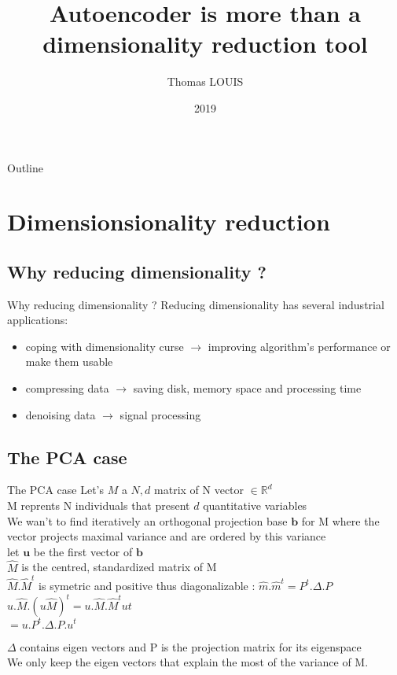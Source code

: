 \documentclass{beamer}
\title{Autoencoder is more than a dimensionality reduction tool}
\author{Thomas LOUIS}
\date{2019}
\newcommand{\reels}{\mathbb{R}}
\begin{document}
\begin{frame}
  \titlepage
\end{frame}

\begin{frame}[shrink=20]{Outline}
  \tableofcontents
\end{frame}

\section{Dimensionsionality reduction}

\subsection{Why reducing dimensionality ?}

\begin{frame}{Why reducing dimensionality ?}
    Reducing dimensionality has several industrial applications:
    \begin{itemize}
	    \item coping with dimensionality curse $\rightarrow$  improving algorithm's performance or make them usable
	    \item compressing data $\rightarrow$ saving disk, memory space and processing time 
	    \item denoising data $\rightarrow$ signal processing 
    \end{itemize}
\end{frame}

\subsection{The PCA case}
\begin{frame}{The PCA case}
    Let's $M$ a ${N, d}$ matrix  of N vector $\in \reels^{d}$\\
    M reprents N individuals that present $d$ quantitative variables \\
    We wan't to find iteratively an orthogonal projection base $\mathbf{b}$ for M where the vector projects maximal variance and are ordered by this variance \\
    let $\mathbf{u}$ be the first vector of $\mathbf{b}$ \\
    $\hat{M}$ is the centred, standardized matrix of M \\
    $\hat{M}.\hat{M}^{t}$ is symetric and positive thus diagonalizable : $\hat{m}.\hat{m}^{t} = P^{t}.\Delta.P$ \\
    $u.\hat{M} . (u\hat{M})^{t} = u.\hat{M}.\hat{M}^{t}u{t}$ \\
    $ = u. P^{t}.\Delta.P. u^{t} $

    $\Delta$ contains eigen vectors and P is the projection matrix for its eigenspace \\

    We only keep the eigen vectors that explain the most of the variance of M. \\
\end{frame}
\end{document}

